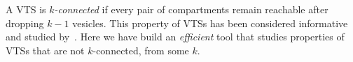 

%

A VTS is {\em $k$-connected} if every pair of compartments remain
reachable after dropping $k-1$ vesicles.
%
This property of VTSs has been considered informative and
studied by~\cite{shukla}.
%
Here we have build an {\em efficient} tool that studies properties of
VTSs that are not $k$-connected, from some $k$. 

